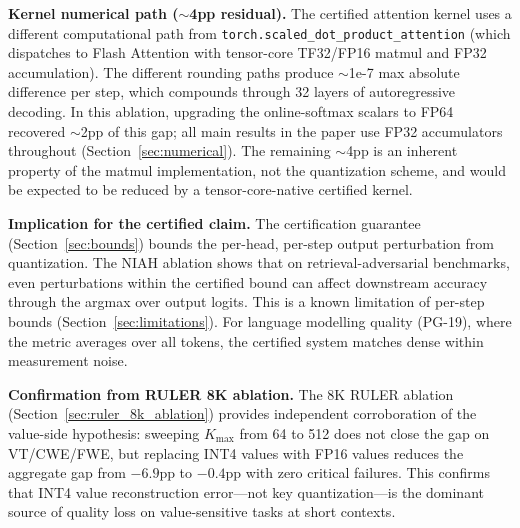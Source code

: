 \documentclass[10pt,twocolumn,a4paper]{article}
\theoremstyle{definition}
\theoremstyle{remark}
\newcommand{\torchsdpa}{\texttt{torch.scaled\_\hspace{0pt}dot\_\hspace{0pt}product\_\hspace{0pt}attention}}
\begin{document}
\textbf{Kernel numerical path ($\sim$4pp residual).}  The certified attention kernel uses a different computational path from \torchsdpa{} (which dispatches to Flash Attention with tensor-core TF32/FP16 matmul and FP32 accumulation).  The different rounding paths produce $\sim$1e-7 max absolute difference per step, which compounds through 32 layers of autoregressive decoding.  In this ablation, upgrading the online-softmax scalars to FP64 recovered $\sim$2pp of this gap; all main results in the paper use FP32 accumulators throughout (Section~\ref{sec:numerical}).  The remaining $\sim$4pp is an inherent property of the matmul implementation, not the quantization scheme, and would be expected to be reduced by a tensor-core-native certified kernel.

\textbf{Implication for the certified claim.}  The certification guarantee (Section~\ref{sec:bounds}) bounds the per-head, per-step output perturbation from quantization.  The NIAH ablation shows that on retrieval-adversarial benchmarks, even perturbations within the certified bound can affect downstream accuracy through the argmax over output logits.  This is a known limitation of per-step bounds (Section~\ref{sec:limitations}).  For language modelling quality (PG-19), where the metric averages over all tokens, the certified system matches dense within measurement noise.

\textbf{Confirmation from RULER 8K ablation.}  The 8K RULER ablation (Section~\ref{sec:ruler_8k_ablation}) provides independent corroboration of the value-side hypothesis: sweeping $K_{\max}$ from 64 to 512 does not close the gap on VT/CWE/FWE, but replacing INT4 values with FP16 values reduces the aggregate gap from $-6.9$pp to $-0.4$pp with zero critical failures.  This confirms that INT4 value reconstruction error---not key quantization---is the dominant source of quality loss on value-sensitive tasks at short contexts.
\end{document}
